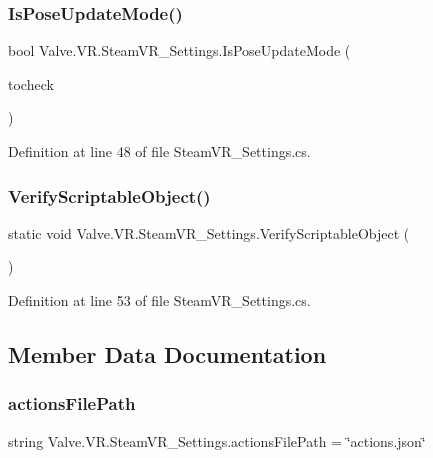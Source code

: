 \subsubsection{\texorpdfstring{IsPoseUpdateMode()}{IsPoseUpdateMode()}}
{\footnotesize\ttfamily bool Valve.\+V\+R.\+Steam\+V\+R\+\_\+\+Settings.\+Is\+Pose\+Update\+Mode (\begin{DoxyParamCaption}\item[{\mbox{\hyperlink{namespace_valve_1_1_v_r_ac8b0fe3bc9754b0fb9f1351ae3444ac6}{Steam\+V\+R\+\_\+\+Update\+Modes}}}]{tocheck }\end{DoxyParamCaption})}



Definition at line 48 of file Steam\+V\+R\+\_\+\+Settings.\+cs.

\mbox{\label{class_valve_1_1_v_r_1_1_steam_v_r___settings_a4a3c0614cefaa05a3aff934f40702b2f}} 
\subsubsection{\texorpdfstring{VerifyScriptableObject()}{VerifyScriptableObject()}}
{\footnotesize\ttfamily static void Valve.\+V\+R.\+Steam\+V\+R\+\_\+\+Settings.\+Verify\+Scriptable\+Object (\begin{DoxyParamCaption}{ }\end{DoxyParamCaption})\hspace{0.3cm}{\ttfamily [static]}}



Definition at line 53 of file Steam\+V\+R\+\_\+\+Settings.\+cs.



\subsection{Member Data Documentation}
\mbox{\label{class_valve_1_1_v_r_1_1_steam_v_r___settings_a6baa46b6747cc8d10f2b3dc218d1b39b}} 
\subsubsection{\texorpdfstring{actionsFilePath}{actionsFilePath}}
{\footnotesize\ttfamily string Valve.\+V\+R.\+Steam\+V\+R\+\_\+\+Settings.\+actions\+File\+Path = \char`\"{}actions.\+json\char`\"{}}



